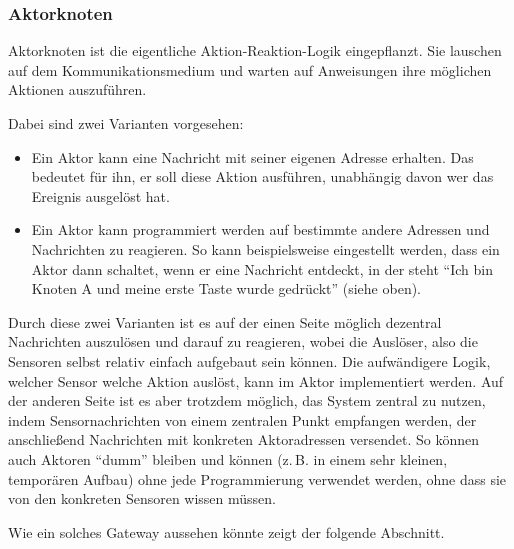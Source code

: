\documentclass{IEEEtran}
\begin{document}
        \subsubsection{Aktorknoten}\label{Aktorknoten}
            Aktorknoten ist die eigentliche Aktion-Reaktion-Logik eingepflanzt.
            Sie lauschen auf dem Kommunikationsmedium und warten auf Anweisungen
            ihre möglichen Aktionen auszuführen.

            Dabei sind zwei Varianten vorgesehen:
            \begin{itemize}
                \item Ein Aktor kann eine Nachricht mit seiner eigenen Adresse
                    erhalten. Das bedeutet für ihn, er soll diese Aktion
                    ausführen, unabhängig davon wer das Ereignis ausgelöst hat.
                \item Ein Aktor kann programmiert werden auf bestimmte andere
                    Adressen und Nachrichten zu reagieren.
                    So kann beispielsweise eingestellt werden, dass ein Aktor
                    dann schaltet, wenn er eine Nachricht entdeckt, in der steht
                    \enquote{Ich bin Knoten A und meine erste Taste
                    wurde gedrückt} (siehe oben).
            \end{itemize}

            Durch diese zwei Varianten ist es auf der einen Seite möglich
            dezentral Nachrichten auszulösen und darauf zu reagieren, wobei
            die Auslöser, also die Sensoren selbst relativ einfach aufgebaut
            sein können. Die aufwändigere Logik, welcher Sensor welche Aktion
            auslöst, kann im Aktor implementiert werden.
            Auf der anderen Seite ist es aber trotzdem möglich, das System
            zentral zu nutzen, indem Sensornachrichten von einem zentralen
            Punkt empfangen werden, der anschließend Nachrichten mit konkreten
            Aktoradressen versendet. So können auch Aktoren \enquote{dumm}
            bleiben und können (z.\,B. in einem sehr kleinen, temporären Aufbau)
            ohne jede Programmierung verwendet werden, ohne dass sie von den
            konkreten Sensoren wissen müssen.

            Wie ein solches Gateway aussehen könnte zeigt der folgende Abschnitt.
\end{document}
